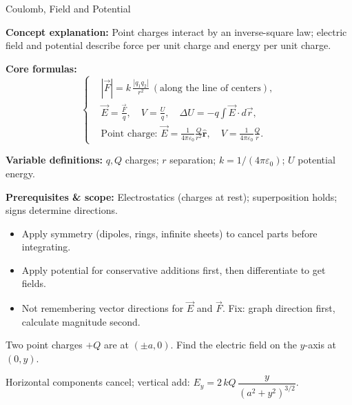 \label{unit:electrostatics}

\begin{KnowledgePoint}{Coulomb, Field and Potential \Core}
  \KPFormulas
  \begin{formulabox}
  \textbf{Concept explanation:} Point charges interact by an inverse-square law; electric field and potential describe force per unit charge and energy per unit charge.

  \textbf{Core formulas:}
  \[
  \left\{\begin{aligned}
    &|\vec F|=k\,\frac{|q_1 q_2|}{r^2}\ (\text{along the line of centers}),\\
    &\vec E=\frac{\vec F}{q},\quad V=\frac{U}{q},\quad \Delta U=-q\int \vec E\cdot d\vec r,\\
    &\text{Point charge: } \vec E=\frac{1}{4\pi\varepsilon_0}\frac{Q}{r^2}\hat{\mathbf r},\quad V=\frac{1}{4\pi\varepsilon_0}\frac{Q}{r}.
  \end{aligned}\right.
  \]

  \textbf{Variable definitions:} $q,Q$ charges; $r$ separation; $k=1/(4\pi\varepsilon_0)$; $U$ potential energy.

  \textbf{Prerequisites \& scope:} Electrostatics (charges at rest); superposition holds; signs determine directions.
  \end{formulabox}

  \KPHeuristics
  \begin{heuristicsbox}
  \begin{itemize}[leftmargin=*]
    \item Apply symmetry (dipoles, rings, infinite sheets) to cancel parts before integrating.
    \item Apply potential for conservative additions first, then differentiate to get fields.
  \end{itemize}
  \vspace{0.4em}
  \begin{itemize}[leftmargin=*]
    \item Not remembering vector directions for $\vec E$ and $\vec F$. Fix: graph direction first, calculate magnitude second.
  \end{itemize}
  \end{heuristicsbox}

  \KPProblems
\begin{cheatproblem}
  Two point charges $+Q$ are at $(\pm a,0)$. Find the electric field on the $y$-axis at $(0,y)$.
  \begin{solutionbox}
  Horizontal components cancel; vertical add: $E_y=2\,kQ\,\dfrac{y}{(a^2+y^2)^{3/2}}$.
  \end{solutionbox}
  \end{cheatproblem}
\end{KnowledgePoint}

